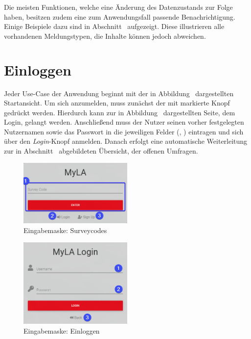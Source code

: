Die meisten Funktionen, welche eine Änderung des Datenzustands zur Folge haben, besitzen zudem eine zum Anwendungsfall passende Benachrichtigung.
Einige Beispiele dazu sind in Abschnitt~ aufgezeigt.
Diese illustrieren alle vorhandenen Meldungstypen, die Inhalte können jedoch abweichen.

\section{Einloggen}
\label{ssec:Einloggen}

Jeder Use-Case der Anwendung beginnt mit der in Abbildung~ dargestellten Startansicht.
Um sich anzumelden, muss zunächst der mit \desTwo markierte Knopf gedrückt werden.
Hierdurch kann zur in Abbildung~ dargestellten Seite, dem Login, gelangt werden.
Anschließend muss der Nutzer seinen vorher festgelegten Nutzernamen sowie das Passwort in die jeweiligen Felder (\desOne, \desTwo) eintragen und sich über den \emph{Login}-Knopf anmelden.
Danach erfolgt eine automatische Weiterleitung zur in Abschnitt~ abgebildeten Übersicht, der offenen Umfragen.

\begin{figure}[H]
	\centering
	\includegraphics[width=0.5\textwidth, keepaspectratio]{img/guide/SurveyCode.png}
	\captionsetup{justification=centering, format=plain}
	\caption[Eingabemaske: Surveycodes]{Eingabemaske: Surveycodes \\\quelleScreenshot}
	\label{fig:EingabemaskeSurveycode}
\end{figure}

\begin{figure}[H]
	\centering
	\includegraphics[width=0.5\textwidth, keepaspectratio]{img/guide/Login.png}
	\captionsetup{justification=centering, format=plain}
	\caption[Eingabemaske: Einloggen]{Eingabemaske: Einloggen \\\quelleScreenshot}
	\label{fig:Einloggen}
\end{figure} 


